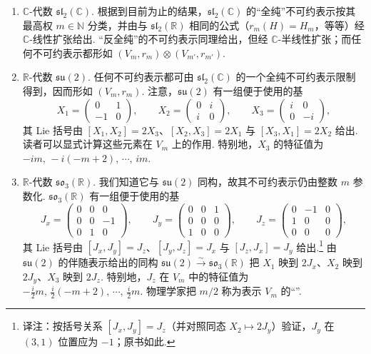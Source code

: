 \begin{numpara}[相关代数的不可约表示]\label{np:lie-1-13-2}
\begin{enumerate}[label=\roman*)]
\item $\mathbb C$-代数 $\mathfrak{sl}_2(\mathbb C)$. 根据到目前为止的结果，$\mathfrak{sl}_2(\mathbb C)$ 的``全纯''不可约表示按其最高权 $m\in\mathbb N$ 分类，并由与 $\mathfrak{sl}_2(\mathbb R)$ 相同的公式（$r_m(H)=H_m$，等等）经 $\mathbb C$-线性扩张给出. ``反全纯''的不可约表示同理给出，但经 $\mathbb C$-半线性扩张；而任何不可约表示都形如 $(V_m,r_m)\otimes(V_{m'},r_{m'})$.
\item $\mathbb R$-代数 $\mathfrak{su}(2)$. 任何不可约表示都可由 $\mathfrak{sl}_2(\mathbb C)$ 的一个全纯不可约表示限制得到，因而形如 $(V_m,r_m)$. 注意，$\mathfrak{su}(2)$ 有一组便于使用的基
\[
X_1=\begin{pmatrix}0&1\\-1&0\end{pmatrix},\qquad
X_2=\begin{pmatrix}0&i\\i&0\end{pmatrix},\qquad
X_3=\begin{pmatrix}i&0\\0&-i\end{pmatrix},
\]
其 Lie 括号由 $[X_1,X_2]=2X_3$、$[X_2,X_3]=2X_1$ 与 $[X_3,X_1]=2X_2$ 给出. 读者可以显式计算这些元素在 $V_m$ 上的作用. 特别地，$X_3$ 的特征值为 $-im,\,-i(-m+2),\,\cdots,\,im$.
\item $\mathbb R$-代数 $\mathfrak{so}_3(\mathbb R)$. 我们知道它与 $\mathfrak{su}(2)$ 同构，故其不可约表示仍由整数 $m$ 参数化. $\mathfrak{so}_3(\mathbb R)$ 有一组便于使用的基
\[
J_x=\begin{pmatrix}0&0&0\\0&0&-1\\0&1&0\end{pmatrix},\qquad
J_y=\begin{pmatrix}0&0&1\\0&0&0\\1&0&0\end{pmatrix},\qquad
J_z=\begin{pmatrix}0&-1&0\\1&0&0\\0&0&0\end{pmatrix},
\]
其 Lie 括号由 $[J_x,J_y]=J_z$、$[J_y,J_z]=J_x$ 与 $[J_z,J_x]=J_y$ 给出.\footnote{译注：按括号关系 $[J_x,J_y]=J_z$（并对照同态 $X_2\mapsto 2J_y$）验证，$J_y$ 在 $(3,1)$ 位置应为 $-1$；原书如此.} 由 $\mathfrak{su}(2)$ 的伴随表示给出的同构 $\mathfrak{su}(2)\stackrel{\sim}{\longrightarrow}\mathfrak{so}_3(\mathbb R)$ 把 $X_1$ 映到 $2J_x$、$X_2$ 映到 $2J_y$、$X_3$ 映到 $2J_z$. 特别地，$J_z$ 在 $V_m$ 中的特征值为 $-\frac{i}{2}m,\,\frac{i}{2}(-m+2),\,\cdots,\,\frac{i}{2}m$. 物理学家把 $m/2$ 称为表示 $V_m$ 的``''.
\end{enumerate}
\end{numpara}

